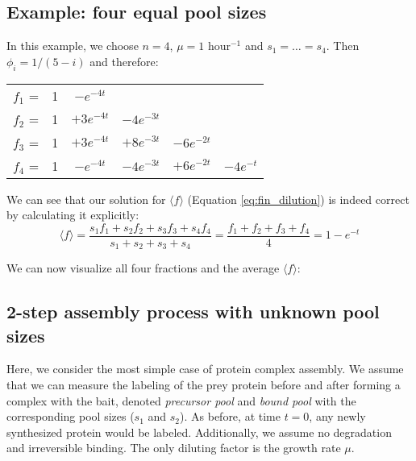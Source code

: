 \documentclass{article}
\newcommand{\fin}{\ensuremath{\langle f \rangle}}
\begin{document}
\subsection{Example: four equal pool sizes}
In this example, we choose $n = 4$, $\mu = 1$ hour$^{-1}$ and $s_1 = \ldots = s_4$. Then $\phi_i = 1/(5-i)$ and therefore:
\begin{center}
\begin{tabular}{cccccc}
    $f_1$ = & 1 & $- e^{-4t}$ &&&\\
    $f_2$ = & 1 & $+ 3 e^{-4t}$ & $- 4 e^{-3t}$ &&\\
    $f_3$ = & 1 & $+ 3 e^{-4t}$ & $+ 8 e^{-3t}$ & $- 6 e^{-2t}$ &\\
    $f_4$ = & 1 & $- e^{-4t}$   & $- 4 e^{-3t}$ & $+ 6 e^{-2t}$ & $- 4 e^{-t}$
\end{tabular}
\end{center}

We can see that our solution for $\fin$ (Equation \ref{eq:fin_dilution}) is indeed correct by calculating it explicitly:
\begin{equation}
    \fin = \frac{s_1 f_1 + s_2 f_2 + s_3 f_3 + s_4 f_4}{s_1 + s_2 + s_3 + s_4} = \frac{f_1 + f_2 + f_3 + f_4}{4} = 1 - e^{-t}
\end{equation}

We can now visualize all four fractions and the average $\fin$:
\begin{center}
\end{center}

\subsection{2-step assembly process with unknown pool sizes}
Here, we consider the most simple case of protein complex assembly. We assume that we can measure the labeling of the prey protein before and after forming a complex with the bait, denoted \textit{precursor pool} and \textit{bound pool} with the corresponding pool sizes ($s_1$ and $s_2$). As before, at time $t = 0$, any newly synthesized protein would be labeled. Additionally, we assume no degradation and irreversible binding. The only diluting factor is the growth rate $\mu$.
\end{document}
